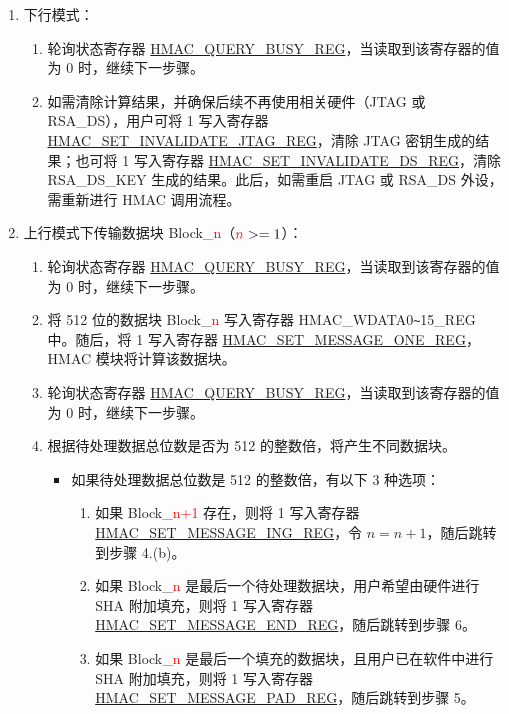 \documentclass[main\_\_CN.tex]{subfiles}
\begin{document}
\begin{enumerate}
    \item 下行模式：
        \begin{enumerate}
            \item 轮询状态寄存器 \hyperref[regdesc:HMACQUERYBUSYREG]{HMAC\_QUERY\_BUSY\_REG}，当读取到该寄存器的值为 0 时，继续下一步骤。
            \item 如需清除计算结果，并确保后续不再使用相关硬件（JTAG 或 RSA\_DS），用户可将 1 写入寄存器 \hyperref[regdesc:HMACSETINVALIDATEJTAGREG]{HMAC\_SET\_INVALIDATE\_JTAG\_REG}，清除 JTAG 密钥生成的结果；也可将 1 写入寄存器 \hyperref[regdesc:HMACSETINVALIDATEDSREG]{HMAC\_SET\_INVALIDATE\_DS\_REG}，清除 RSA\_DS\_KEY 生成的结果。此后，如需重启 JTAG 或 RSA\_DS 外设，需重新进行 HMAC 调用流程。
        \end{enumerate}

    \item 上行模式下传输数据块 Block\_\textcolor{red}{n}（$\textcolor{red}{n}>=1$）：
        \begin{enumerate}
            \item 轮询状态寄存器 \hyperref[regdesc:HMACQUERYBUSYREG]{HMAC\_QUERY\_BUSY\_REG}，当读取到该寄存器的值为 0 时，继续下一步骤。
            \item 将 512 位的数据块 Block\_\textcolor{red}{n} 写入寄存器 HMAC\_WDATA0\verb+~+15\_REG 中。随后，将 1 写入寄存器 \hyperref[regdesc:HMACSETMESSAGEONEREG]{HMAC\_SET\_MESSAGE\_ONE\_REG}，HMAC 模块将计算该数据块。
            \item 轮询状态寄存器 \hyperref[regdesc:HMACQUERYBUSYREG]{HMAC\_QUERY\_BUSY\_REG}，当读取到该寄存器的值为 0 时，继续下一步骤。
            \item 根据待处理数据总位数是否为 512 的整数倍，将产生不同数据块。
            \begin{itemize}
                \item 如果待处理数据总位数是 512 的整数倍，有以下 3 种选项：
                \begin{enumerate}
                    \item 如果 Block\_\textcolor{red}{n+1} 存在，则将 1 写入寄存器 \hyperref[regdesc:HMACSETMESSAGEINGREG]{HMAC\_SET\_MESSAGE\_ING\_REG}，令 $n=n+1$，随后跳转到步骤 4.(b)。
                    \item 如果 Block\_\textcolor{red}{n} 是最后一个待处理数据块，用户希望由硬件进行 SHA 附加填充，则将 1 写入寄存器 \hyperref[regdesc:HMACSETMESSAGEENDREG]{HMAC\_SET\_MESSAGE\_END\_REG}，随后跳转到步骤 6。
                    \item 如果 Block\_\textcolor{red}{n} 是最后一个填充的数据块，且用户已在软件中进行 SHA 附加填充，则将 1 写入寄存器 \hyperref[regdesc:HMACSETMESSAGEPADREG]{HMAC\_SET\_MESSAGE\_PAD\_REG}，随后跳转到步骤 5。

\end{enumerate}
\end{itemize}
\end{enumerate}
\end{enumerate}
\end{document}
